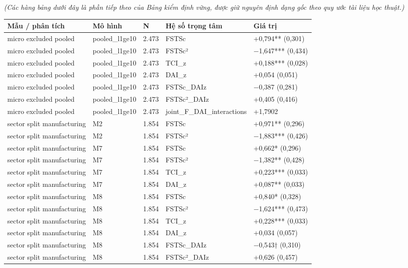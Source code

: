 \documentclass[12pt,a4paper]{article}
\begin{document}
\emph{(Các hàng bảng dưới đây là phần tiếp theo của Bảng kiểm định vững,
được giữ nguyên định dạng gốc theo quy ước tài liệu học thuật.)}

\begin{longtable}[]{@{}lllll@{}}
\toprule\noalign{}
Mẫu / phân tích & Mô hình & N & Hệ số trọng tâm & Giá trị \\
\midrule\noalign{}
\endhead
\bottomrule\noalign{}
\endlastfoot
micro excluded pooled & pooled\_l1ge10 & 2.473 & FSTSc & +0,794**
(0,301) \\
micro excluded pooled & pooled\_l1ge10 & 2.473 & FSTSc² & −1,647***
(0,434) \\
micro excluded pooled & pooled\_l1ge10 & 2.473 & TCI\_z & +0,188***
(0,028) \\
micro excluded pooled & pooled\_l1ge10 & 2.473 & DAI\_z & +0,054
(0,051) \\
micro excluded pooled & pooled\_l1ge10 & 2.473 & FSTSc\_DAIz & −0,387
(0,281) \\
micro excluded pooled & pooled\_l1ge10 & 2.473 & FSTSc²\_DAIz & +0,405
(0,416) \\
micro excluded pooled & pooled\_l1ge10 & 2.473 &
joint\_F\_DAI\_interactions & +1,7902 \\
sector split manufacturing & M2 & 1.854 & FSTSc & +0,971** (0,296) \\
sector split manufacturing & M2 & 1.854 & FSTSc² & −1,883*** (0,426) \\
sector split manufacturing & M7 & 1.854 & FSTSc & +0,662* (0,296) \\
sector split manufacturing & M7 & 1.854 & FSTSc² & −1,382** (0,428) \\
sector split manufacturing & M7 & 1.854 & TCI\_z & +0,223*** (0,033) \\
sector split manufacturing & M7 & 1.854 & DAI\_z & +0,087** (0,033) \\
sector split manufacturing & M8 & 1.854 & FSTSc & +0,840* (0,328) \\
sector split manufacturing & M8 & 1.854 & FSTSc² & −1,624*** (0,473) \\
sector split manufacturing & M8 & 1.854 & TCI\_z & +0,228*** (0,033) \\
sector split manufacturing & M8 & 1.854 & DAI\_z & +0,034 (0,057) \\
sector split manufacturing & M8 & 1.854 & FSTSc\_DAIz & −0,543†
(0,310) \\
sector split manufacturing & M8 & 1.854 & FSTSc²\_DAIz & +0,626
(0,457) \\

\end{longtable}
\end{document}
